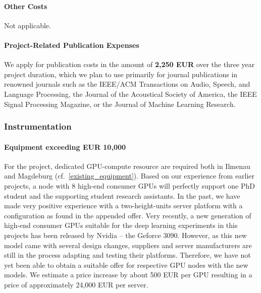 \documentclass[11pt]{article}
\begin{document}
\paragraph{Other Costs}
Not applicable. 
\paragraph{Project-Related Publication Expenses}
We apply for publication costs in the amount of \textbf{2,250 EUR} over the three year project duration, which we plan to use primarily for journal publications in renowned journals such as the IEEE/ACM Transactions on Audio, Speech, and Language Processing, the Journal of the Acoustical Society of America, the IEEE Signal Processing Magazine, or the Journal of Machine Learning Research.

\subsubsection{Instrumentation}

\paragraph{Equipment exceeding EUR 10,000}
\label{big_equipment}
For the project, dedicated GPU-compute resource are required both in Ilmenau and Magdeburg (cf.~\ref{existing_equipment}).
Based on our experience from earlier projects, a node with 8 high-end consumer GPUs will perfectly support one PhD student and the supporting student research assistants.
In the past, we have made very positive experience with a two-height-units server platform with a configuration as found in the appended offer. 
Very recently, a new generation of high-end consumer GPUs suitable for the deep learning experiments in this projects has been released by Nvidia -- the Geforce 3090.
However, as this new model came with several design changes, suppliers and server manufacturers are still in the process adapting and testing their platforms.
Therefore, we have not yet been able to obtain a suitable offer for respective GPU nodes with the new models.
We estimate a price increase by about 500 EUR per GPU resulting in a price of approximately 24,000 EUR per server.
\end{document}
